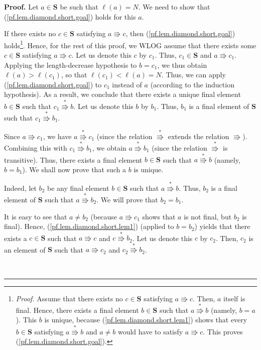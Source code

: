 \documentclass[numbers=enddot,12pt,final,onecolumn,notitlepage]{scrartcl}%
\theoremstyle{definition}
\newenvironment{proof}[1][Proof]{\noindent\textbf{#1.} }{\ \rule{0.5em}{0.5em}}
\newenvironment{vershort}{}{}
\begin{document}
\begin{vershort}
\begin{proof}
Let $a\in\mathbf{S}$ be such that $\ell\left(  a\right)  =N$. We need to show
that (\ref{pf.lem.diamond.short.goal}) holds for this $a$.

If there exists no $c\in\mathbf{S}$ satisfying $a\Rrightarrow c$, then
(\ref{pf.lem.diamond.short.goal}) holds\footnote{\textit{Proof.} Assume that
there exists no $c\in\mathbf{S}$ satisfying $a\Rrightarrow c$. Then, $a$
itself is final. Hence, there exists a final element $b\in\mathbf{S}$ such
that $a\overset{\ast}{\Rrightarrow}b$ (namely, $b=a$). This $b$ is unique,
because (\ref{pf.lem.diamond.short.lem1}) shows that every $b\in\mathbf{S}$
satisfying $a\overset{\ast}{\Rrightarrow}b$ and $a\neq b$ would have to
satisfy $a\Rrightarrow c$. This proves (\ref{pf.lem.diamond.short.goal}).}.
Hence, for the rest of this proof, we WLOG assume that there exists some
$c\in\mathbf{S}$ satisfying $a\Rrightarrow c$. Let us denote this $c$ by
$c_{1}$. Thus, $c_{1}\in\mathbf{S}$ and\textbf{ }$a\Rrightarrow c_{1}$.
Applying the length-decrease hypothesis to $b=c_{1}$, we thus obtain
$\ell\left(  a\right)  >\ell\left(  c_{1}\right)  $, so that $\ell\left(
c_{1}\right)  <\ell\left(  a\right)  =N$. Thus, we can apply
(\ref{pf.lem.diamond.short.goal}) to $c_{1}$ instead of $a$ (according to the
induction hypothesis). As a result, we conclude that there exists a unique
final element $b\in\mathbf{S}$ such that $c_{1}\overset{\ast}{\Rrightarrow}b$.
Let us denote this $b$ by $b_{1}$. Thus, $b_{1}$ is a final element of
$\mathbf{S}$ such that $c_{1}\overset{\ast}{\Rrightarrow}b_{1}$.

Since $a\Rrightarrow c_{1}$, we have $a\overset{\ast}{\Rrightarrow}c_{1}$
(since the relation $\overset{\ast}{\Rrightarrow}$ extends the relation
$\Rrightarrow$). Combining this with $c_{1}\overset{\ast}{\Rrightarrow}b_{1}$,
we obtain $a\overset{\ast}{\Rrightarrow}b_{1}$ (since the relation
$\overset{\ast}{\Rrightarrow}$ is transitive). Thus, there exists a final
element $b\in\mathbf{S}$ such that $a\overset{\ast}{\Rrightarrow}b$ (namely,
$b=b_{1}$). We shall now prove that such a $b$ is unique.

Indeed, let $b_{2}$ be any final element $b\in\mathbf{S}$ such that
$a\overset{\ast}{\Rrightarrow}b$. Thus, $b_{2}$ is a final element of
$\mathbf{S}$ such that $a\overset{\ast}{\Rrightarrow}b_{2}$. We will prove
that $b_{2}=b_{1}$.

It is easy to see that $a\neq b_{2}$ (because $a\Rrightarrow c_{1}$ shows that
$a$ is not final, but $b_{2}$ is final). Hence,
(\ref{pf.lem.diamond.short.lem1}) (applied to $b=b_{2}$) yields that there
exists a $c\in\mathbf{S}$ such that $a\Rrightarrow c$ and $c\overset{\ast
}{\Rrightarrow}b_{2}$. Let us denote this $c$ by $c_{2}$. Then, $c_{2}$ is an
element of $\mathbf{S}$ such that $a\Rrightarrow c_{2}$ and $c_{2}%
\overset{\ast}{\Rrightarrow}b_{2}$.


\end{proof}
\end{vershort}
\end{document}
